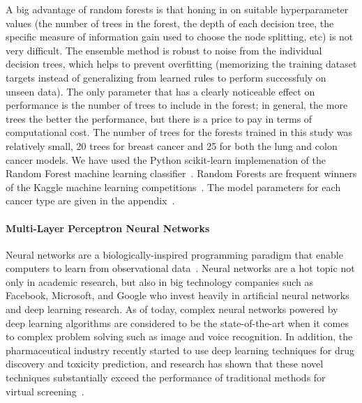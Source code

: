 \documentclass[10pt,letterpaper]{article}
\begin{document}
A big advantage of random forests is that honing in on suitable hyperparameter values (the number of trees in the forest, the depth of each decision tree, the specific measure of information gain used to choose the node splitting, etc) is not very difficult. The ensemble method is robust to noise from the individual decision trees, which helps to prevent overfitting (memorizing the training dataset targets instead of generalizing from learned rules to perform successfuly on unseen data). The only parameter that has a clearly noticeable effect on performance is the number of trees to include in the forest; in general, the more trees the better the performance, but there is a price to pay in terms of computational cost. The number of trees for the forests trained in this study was relatively small, 20 trees for breast cancer and 25 for both the lung and colon cancer models. We have used the Python scikit-learn implemenation of the Random Forest machine 
learning classifier~\cite{rf}.
Random Forests are frequent winners of the Kaggle machine learning competitions~\cite{kagglerf}.
The model parameters for each cancer type are given in the appendix~.



\paragraph{Multi-Layer Perceptron Neural Networks}
Neural networks are a biologically-inspired programming paradigm that enable computers to learn from observational data~\cite{deeplearning}.
 Neural networks are a hot topic not only in academic research, but also in big technology companies such as Facebook, Microsoft, and Google who invest heavily in artificial neural networks and deep learning research. As of today, complex neural networks powered by deep learning algorithms are considered to be the state-of-the-art when it comes to complex problem solving such as image and voice recognition.
In addition, the pharmaceutical industry recently started to use deep learning techniques for drug discovery and toxicity prediction, and research has shown that these novel techniques substantially exceed the performance of traditional methods for virtual screening~\cite{toxicity}.
\end{document}
